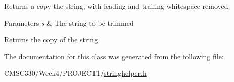 Returns a copy the string, with leading and trailing whitespace removed. 
\begin{DoxyParams}{Parameters}
{\em s} & The string to be trimmed \\
\hline
\end{DoxyParams}
\begin{DoxyReturn}{Returns}
the copy of the string 
\end{DoxyReturn}


The documentation for this class was generated from the following file\+:\begin{DoxyCompactItemize}
\item 
C\+M\+S\+C330/\+Week4/\+P\+R\+O\+J\+E\+C\+T1/\hyperlink{stringhelper_8h}{stringhelper.\+h}\end{DoxyCompactItemize}
